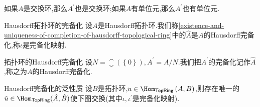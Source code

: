 \begin{remark}{}{}
	如果$A$是交换环,那么$A^{\prime}$也是交换环;如果$A$有单位元,那么$A^{\prime}$也有单位元.
\end{remark}

\begin{definition}{Hausdorff拓扑环的完备化}{}
	设$A$是Hausdorff拓扑环.我们称\cref{existence-and-uniqueness-of-completion-of-hausdorff-topological-ring}中的$\hat{A}$是$A$的Hausdorff完备化,称$\iota$是完备化映射.
\end{definition}

\begin{definition}{拓扑环的Hausdorff完备化}{}
	设$N=\closure\left(\left\{0\right\}\right),A^{\prime}=A/N$.我们把$A^{\prime}$的完备化记作$\hat{A}$,称之为$A$的Hausdorff完备化.
\end{definition}

\begin{proposition}{Hausdorff完备化的泛性质}{}
	设$B$是拓扑环,$u\in\Hom_{\mathsf{TopRing}}\left(A,B\right)$,则存在唯一的$\hat{u}\in\Hom_{\mathsf{TopRing}}(\hat{A},\hat{B})$使下图交换(其中$\iota,\iota^{\prime}$是完备化映射).
	\begin{center}
	\end{center}
\end{proposition}
